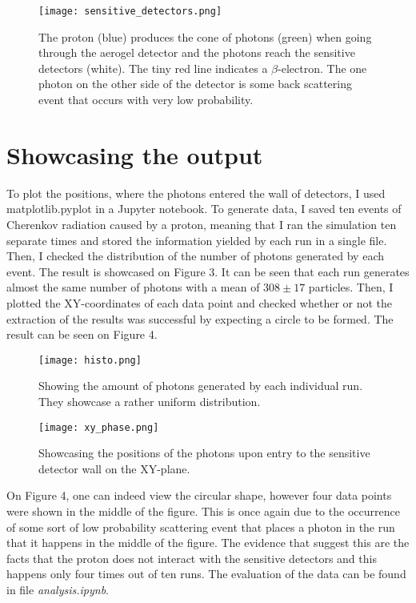 \documentclass[12pt,twocolumn]{article}
\begin{document}
\begin{figure}[H]
    \centering
    \texttt{[image: sensitive\_detectors.png]}
    \caption{The proton (blue) produces the cone of photons (green) when going through the aerogel detector and the photons reach the sensitive detectors (white). The tiny red line indicates a $\beta$-electron. The one photon on the other side of the detector is some back scattering event that occurs with very low probability.}
    \label{fig:my_label}
\end{figure}

\section{Showcasing the output}

To plot the positions, where the photons entered the wall of detectors, I used matplotlib.pyplot in a Jupyter notebook. To generate data, I saved ten events of Cherenkov radiation caused by a proton, meaning that I ran the simulation ten separate times and stored the information yielded by each run in a single file. Then, I checked the distribution of the number of photons generated by each event. The result is showcased on Figure 3. It can be seen that each run generates almost the same number of photons with a mean of $308\pm17$ particles. Then, I plotted the XY-coordinates of each data point and checked whether or not the extraction of the results was successful by expecting a circle to be formed. The result can be seen on Figure 4.

\begin{figure}[H]
    \centering
    \texttt{[image: histo.png]}
    \caption{Showing the amount of photons generated by each individual run. They showcase a rather uniform distribution.}
    \label{fig:my_label}
\end{figure}
\begin{figure}[H]
    \centering
    \texttt{[image: xy\_phase.png]}
    \caption{Showcasing the positions of the photons upon entry to the sensitive detector wall on the XY-plane.}
    \label{fig:my_label}
\end{figure}

On Figure 4, one can indeed view the circular shape, however four data points were shown in the middle of the figure. This is once again due to the occurrence of some sort of low probability scattering event that places a photon in the run that it happens in the middle of the figure. The evidence that suggest this are the facts that the proton does not interact with the sensitive detectors and this happens only four times out of ten runs. The evaluation of the data can be found in file \emph{analysis.ipynb}.
\end{document}
